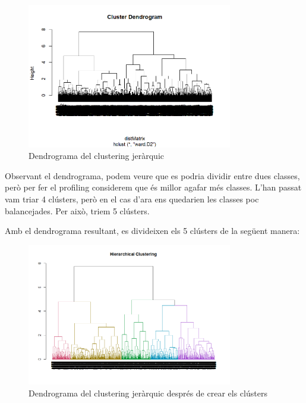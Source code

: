 \documentclass{article}
\begin{document}
\begin{figure}[H]
    \centering
    \includegraphics[width=0.8\textwidth]{Images/4_clustering/herarchical/dendogram.png}
    \caption{Dendrograma del clustering jeràrquic}
    \label{fig:dendogram}
\end{figure}

Observant el dendrograma, podem veure que es podria dividir entre dues classes, però per fer el profiling considerem que és millor agafar més classes. L'han passat vam triar 4 clústers, però en el cas d'ara ens quedarien les classes poc balancejades. Per això, triem 5 clústers.  

Amb el dendrograma resultant, es divideixen els 5 clústers de la següent manera: 

\begin{figure}[H]
    \centering
    \includegraphics[width=0.8\textwidth]{Images/4_clustering/herarchical/hierarchical_dendogram_colors2.png}
    \caption{Dendrograma del clustering jeràrquic després de crear els clústers}
    \label{fig:hierarchical_dendogram_colors2}
\end{figure}
\end{document}
